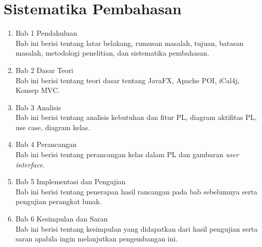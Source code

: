 \section{Sistematika Pembahasan}
\label{sec:sispem}
\begin{enumerate}
	\item Bab 1 Pendahuluan\\
	Bab ini berisi tentang latar belakang, rumusan masalah, tujuan, batasan masalah, metodologi penelitian, dan sistematika pembahasan.
	\item Bab 2 Dasar Teori\\
	Bab ini berisi tentang teori dasar tentang JavaFX, Apache POI, iCal4j, Konsep MVC.
	\item Bab 3 Analisis\\
	Bab ini berisi tentang analisis kebutuhan dan fitur PL, diagram aktifitas PL, use case, diagram kelas.
	\item Bab 4 Perancangan\\
	Bab ini berisi tentang perancangan kelas dalam PL dan gambaran \textit{user interface}.
	\item Bab 5 Implementasi dan Pengujian\\
	Bab ini berisi tentang penerapan hasil rancangan pada bab sebelumnya serta pengujian perangkat lunak.
	\item Bab 6 Kesimpulan dan Saran\\
	Bab ini berisi tentang kesimpulan yang didapatkan dari hasil pengujian serta saran apabila ingin melanjutkan pengembangan ini.
\end{enumerate}